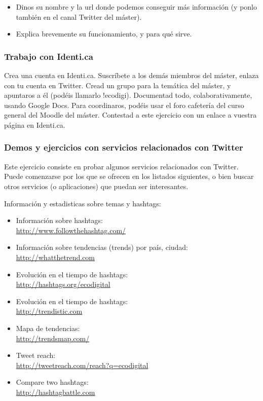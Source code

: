 \documentclass[a4paper,12pt]{article}
\begin{document}
\begin{itemize}
\item Dinos su nombre y la url donde podemos conseguir más información (y ponlo también en el canal Twitter del máster).
\item Explica brevemente su funcionamiento, y para qué sirve.
\end{itemize}

\subsubsection{Trabajo con Identi.ca}
\label{sub:identica}

Crea una cuenta en Identi.ca. Suscríbete a los demás miembros del máster, enlaza con tu cuenta en Twitter. Cread un grupo para la temática del máster, y apuntaros a él (podéis llamarlo !ecodigi). Documentad todo, colaborativamente, usando Google Docs. Para coordinaros, podéis usar el foro cafetería del curso general del Moodle del máster. Contestad a este ejercicio con un enlace a vuestra página en Identi.ca.

\subsubsection{Demos y ejercicios con servicios relacionados con Twitter}
\label{sub:twitter-relacion}

Este ejercicio consiste en probar algunos servicios relacionados con Twitter. Puede comenzarse por los que se ofrecen en los listados siguientes, o bien buscar otros servicios (o aplicaciones) que puedan ser interesantes.

Información y estadisticas sobre temas y hashtags:

\begin{itemize}
\item Información sobre hashtags: \\
   \url{http://www.followthehashtag.com/}

\item Información sobre tendencias (trends) por país, ciudad: \\
   \url{http://whatthetrend.com}

\item Evolución en el tiempo de hashtags: \\
   \url{http://hashtags.org/ecodigital}
   
\item Evolución en el tiempo de hashtags: \\
  \url{http://trendistic.com}

\item Mapa de tendencias: \\
  \url{http://trendsmap.com/}

\item Tweet reach: \\
  \url{http://tweetreach.com/reach?q=ecodigital}

\item Compare two hashtags: \\
  \url{http://hashtagbattle.com}
\end{itemize}
\end{document}
